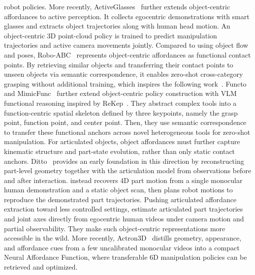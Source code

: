 \documentclass[Afour,sageh,times]{sagej}
\begin{document}
robot policies. More recently, ActiveGlasses~\citep{zou2026activeglasses} further extends object-centric affordances to active perception. It collects egocentric demonstrations with smart glasses and extracts object trajectories along with human head motion. An object-centric 3D point-cloud policy is trained to predict manipulation trajectories and active camera movements jointly. Compared to using object flow and poses, Robo-ABC~\citep{ju2024robo} represents object-centric affordances as functional contact points. By retrieving similar objects and transferring their contact points to unseen objects via semantic correspondence, it enables zero-shot cross-category grasping without additional training, which inspires the following work~\citep{kuang2024ram}. Functo~\citep{tang2025functo} and MimicFunc~\citep{tang2025mimicfunc} further extend object-centric policy construction with VLM functional reasoning inspired by ReKep~\citep{huang2024rekep}. They abstract complex tools into a function-centric spatial skeleton defined by three keypoints, namely the grasp point, function point, and center point. Then, they use semantic correspondence to transfer these functional anchors across novel heterogeneous tools for zero-shot manipulation. For articulated objects, object affordances must further capture kinematic structure and part-state evolution, rather than only static contact anchors. Ditto~\citep{jiang2022ditto} provides an early foundation in this direction by reconstructing part-level geometry together with the articulation model from observations before and after interaction. \citep{kerr2024robot} instead recovers 4D part motion from a single monocular human demonstration and a static object scan, then plans robot motions to reproduce the demonstrated part trajectories. Pushing articulated affordance extraction toward less controlled settings, \cite{werby2025articulated} estimate articulated part trajectories and joint axes directly from egocentric human videos under camera motion and partial observability. They make such object-centric representations more accessible in the wild. More recently, Actron3D~\citep{zhang2025actron3d} distills geometry, appearance, and affordance cues from a few uncalibrated monocular videos into a compact Neural Affordance Function, where transferable 6D manipulation policies can be retrieved and optimized. 
\end{document}
